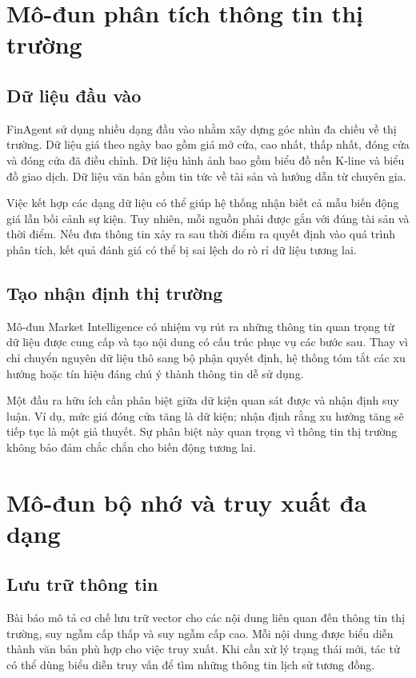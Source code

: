 \section{Mô-đun phân tích thông tin thị trường}

\subsection{Dữ liệu đầu vào}
FinAgent sử dụng nhiều dạng đầu vào nhằm xây dựng góc nhìn đa chiều về thị trường. Dữ liệu giá theo ngày bao gồm giá mở cửa, cao nhất, thấp nhất, đóng cửa và đóng cửa đã điều chỉnh. Dữ liệu hình ảnh bao gồm biểu đồ nến K-line và biểu đồ giao dịch. Dữ liệu văn bản gồm tin tức về tài sản và hướng dẫn từ chuyên gia.

Việc kết hợp các dạng dữ liệu có thể giúp hệ thống nhận biết cả mẫu biến động giá lẫn bối cảnh sự kiện. Tuy nhiên, mỗi nguồn phải được gắn với đúng tài sản và thời điểm. Nếu đưa thông tin xảy ra sau thời điểm ra quyết định vào quá trình phân tích, kết quả đánh giá có thể bị sai lệch do rò rỉ dữ liệu tương lai.

\subsection{Tạo nhận định thị trường}
Mô-đun Market Intelligence có nhiệm vụ rút ra những thông tin quan trọng từ dữ liệu được cung cấp và tạo nội dung có cấu trúc phục vụ các bước sau. Thay vì chỉ chuyển nguyên dữ liệu thô sang bộ phận quyết định, hệ thống tóm tắt các xu hướng hoặc tín hiệu đáng chú ý thành thông tin dễ sử dụng.

Một đầu ra hữu ích cần phân biệt giữa dữ kiện quan sát được và nhận định suy luận. Ví dụ, mức giá đóng cửa tăng là dữ kiện; nhận định rằng xu hướng tăng sẽ tiếp tục là một giả thuyết. Sự phân biệt này quan trọng vì thông tin thị trường không bảo đảm chắc chắn cho biến động tương lai.

\section{Mô-đun bộ nhớ và truy xuất đa dạng}

\subsection{Lưu trữ thông tin}
Bài báo mô tả cơ chế lưu trữ vector cho các nội dung liên quan đến thông tin thị trường, suy ngẫm cấp thấp và suy ngẫm cấp cao. Mỗi nội dung được biểu diễn thành văn bản phù hợp cho việc truy xuất. Khi cần xử lý trạng thái mới, tác tử có thể dùng biểu diễn truy vấn để tìm những thông tin lịch sử tương đồng.

